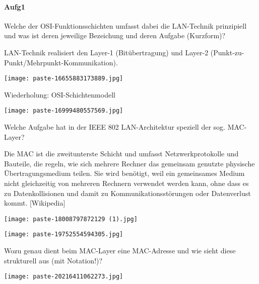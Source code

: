 \documentclass{article}
\begin{document}
\paragraph{Aufg1}
\begin{tcolorbox}[colback=white!10!white,colframe=lightgray!75!black,
  savelowerto=\jobname_ex.tex,breakable,enhanced,lines before break=40]

\justifying
Welche der OSI-Funktionsschichten umfasst dabei die LAN-Technik prinzipiell und was ist deren jeweilige Bezeichung und deren Aufgabe (Kurzform)?

\tcblower

\justifying
LAN-Technik realisiert den Layer-1 (Bitübertragung) und Layer-2 (Punkt-zu-Punkt/Mehrpunkt-Kommunikation).\begin{center}
\texttt{[image: paste-16655883173889.jpg]}
\end{center}
Wiederholung: OSI-Schichtenmodell\begin{center}
\texttt{[image: paste-16999480557569.jpg]}
\end{center}

\end{tcolorbox}
\begin{tcolorbox}[colback=white!10!white,colframe=lightgray!75!black,
  savelowerto=\jobname_ex.tex,breakable,enhanced,lines before break=40]

\justifying
Welche Aufgabe hat in der IEEE 802 LAN-Architektur speziell der sog. MAC-Layer?

\tcblower

\justifying
Die MAC ist die zweitunterste Schicht und umfasst Netzwerkprotokolle und Bauteile, die regeln, wie sich mehrere Rechner das gemeinsam genutzte physische Übertragungsmedium teilen. Sie wird benötigt, weil ein gemeinsames Medium nicht gleichzeitig von mehreren Rechnern verwendet werden kann, ohne dass es zu Datenkollisionen und damit zu Kommunikationsstörungen oder Datenverlust kommt. [Wikipedia]\begin{center}
\texttt{[image: paste-18008797872129 (1).jpg]}
\end{center}
\begin{center}
\texttt{[image: paste-19752554594305.jpg]}
\end{center}

\end{tcolorbox}
\begin{tcolorbox}[colback=white!10!white,colframe=lightgray!75!black,
  savelowerto=\jobname_ex.tex,breakable,enhanced,lines before break=40]

\justifying
Wozu genau dient beim MAC-Layer eine MAC-Adresse und wie sieht diese strukturell aus (mit Notation!)?

\tcblower

\justifying
\begin{center}
\texttt{[image: paste-20216411062273.jpg]}
\end{center}

\end{tcolorbox}
\end{document}
